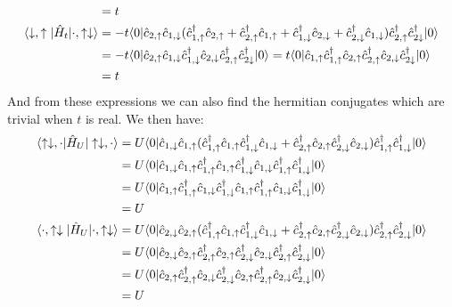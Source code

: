 \documentclass[12pt]{article}
\begin{document}
\begin{align}
&=t\notag\\
\langle\downarrow,\uparrow|\hat{H}_t|\cdot,\uparrow\downarrow\rangle&=-t\langle0|\hat{c}_{2,\uparrow}\hat{c}_{1,\downarrow}(\hat{c}_{1,\uparrow}^\dagger \hat{c}_{2,\uparrow}+\hat{c}_{2,\uparrow}^\dagger \hat{c}_{1,\uparrow}+\hat{c}_{1,\downarrow}^\dagger \hat{c}_{2,\downarrow}+\hat{c}_{2,\downarrow}^\dagger \hat{c}_{1,\downarrow})\hat{c}_{2,\uparrow}^\dagger\hat{c}_{2\downarrow}^\dagger|0\rangle\\
&=-t\langle0|\hat{c}_{2,\uparrow}\hat{c}_{1,\downarrow}\hat{c}_{1,\downarrow}^\dagger \hat{c}_{2,\downarrow}\hat{c}_{2,\uparrow}^\dagger\hat{c}_{2\downarrow}^\dagger|0\rangle=t\langle0|\hat{c}_{1,\uparrow}\hat{c}_{1,\uparrow}^\dagger \hat{c}_{2,\uparrow}\hat{c}_{2,\uparrow}^\dagger\hat{c}_{2,\downarrow}\hat{c}_{2\downarrow}^\dagger|0\rangle\notag\\
&=t\notag
\end{align}
And from these expressions we can also find the hermitian conjugates which are trivial when $t$ is real. We then have:
\begin{align}
\langle\uparrow\downarrow,\cdot|\hat{H}_U|\uparrow\downarrow,\cdot\rangle&=U\langle0|\hat{c}_{1,\downarrow}\hat{c}_{1,\uparrow}(\hat{c}_{1,\uparrow}^\dagger \hat{c}_{1,\uparrow}\hat{c}_{1,\downarrow}^\dagger \hat{c}_{1,\downarrow}+\hat{c}_{2,\uparrow}^\dagger \hat{c}_{2,\uparrow}\hat{c}_{2,\downarrow}^\dagger \hat{c}_{2,\downarrow})\hat{c}_{1,\uparrow}^\dagger\hat{c}_{1,\downarrow}^\dagger|0\rangle\\
&=U\langle0|\hat{c}_{1,\downarrow}\hat{c}_{1,\uparrow}\hat{c}_{1,\uparrow}^\dagger \hat{c}_{1,\uparrow}\hat{c}_{1,\downarrow}^\dagger \hat{c}_{1,\downarrow}\hat{c}_{1,\uparrow}^\dagger\hat{c}_{1,\downarrow}^\dagger|0\rangle\notag\\
&=U\langle0|\hat{c}_{1,\uparrow}\hat{c}_{1,\uparrow}^\dagger \hat{c}_{1,\downarrow}\hat{c}_{1,\downarrow}^\dagger \hat{c}_{1,\uparrow}\hat{c}_{1,\uparrow}^\dagger\hat{c}_{1,\downarrow}\hat{c}_{1,\downarrow}^\dagger|0\rangle\notag\\
&=U\notag\\
\langle \cdot,\uparrow\downarrow|\hat{H}_U|\cdot,\uparrow\downarrow\rangle&=U\langle0|\hat{c}_{2,\downarrow}\hat{c}_{2,\uparrow}(\hat{c}_{1,\uparrow}^\dagger \hat{c}_{1,\uparrow}\hat{c}_{1,\downarrow}^\dagger \hat{c}_{1,\downarrow}+\hat{c}_{2,\uparrow}^\dagger \hat{c}_{2,\uparrow}\hat{c}_{2,\downarrow}^\dagger \hat{c}_{2,\downarrow})\hat{c}_{2,\uparrow}^\dagger\hat{c}_{2,\downarrow}^\dagger|0\rangle\\
&=U\langle0|\hat{c}_{2,\downarrow}\hat{c}_{2,\uparrow}\hat{c}_{2,\uparrow}^\dagger \hat{c}_{2,\uparrow}\hat{c}_{2,\downarrow}^\dagger \hat{c}_{2,\downarrow}\hat{c}_{2,\uparrow}^\dagger\hat{c}_{2,\downarrow}^\dagger|0\rangle\notag\\
&=U\langle0|\hat{c}_{2,\uparrow}\hat{c}_{2,\uparrow}^\dagger \hat{c}_{2,\downarrow}\hat{c}_{2,\downarrow}^\dagger \hat{c}_{2,\uparrow}\hat{c}_{2,\uparrow}^\dagger\hat{c}_{2,\downarrow}\hat{c}_{2,\downarrow}^\dagger|0\rangle\notag\\
&=U\notag
\end{align}
\end{document}
